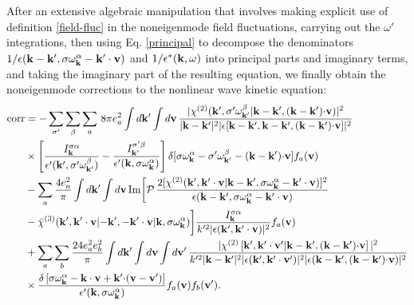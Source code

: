 \documentclass[12pt,a4paper,ruledheader]{report}
\begin{document}
After an extensive algebraic manipulation that involves making explicit
use of definition \cref{field-fluc} in the noneigenmode field fluctuations,
carrying out the $\omega '$ integrations, then using Eq. \eqref{principal}
to decompose the denominators
$1/\epsilon({\bf k-k'},\sigma \omega_{\bf k}^\alpha-{\bf k'\cdot v})$
and $1/\epsilon^*({\bf k},\omega)$ into principal parts and imaginary terms,
and taking the imaginary part of the resulting equation, we finally obtain
the noneigenmode corrections to the nonlinear wave kinetic equation:
\begin{equation}
  \label{corr}
  \begin{split}
    \mbox{corr}&=-\sum_{\sigma '}\sum_\beta\sum_a \,8\pi e_a^2
    \int d{\bf k'}\int d{\bf v}\,
    \frac{|\chi^{(2)}({\bf k'},\sigma '\omega_{\bf k'}^\beta|{\bf k-k'},
      ({\bf k-k'}){\bf \cdot v})|^2}
    {|{\bf k-k'}|^2|\epsilon[{\bf k-k'},{\bf k-k'},({\bf k-k'}){\bf \cdot v}]|^2}\\
    &\times \left[ \frac{I_{\bf k}^{\sigma \alpha}}
      {\epsilon '({\bf k'},\sigma '\omega_{\bf k'}^\beta)}
      -\frac{I_{\bf k'}^{\sigma '\beta}}
	{\epsilon '({\bf k},\sigma \omega_{\bf k}^\alpha)}\right] 
    \delta[\sigma\omega_{\bf k}^\alpha-\sigma '\omega_{\bf k'}^\beta
    -({\bf k-k'}){\bf \cdot v}]f_a({\bf v})\\
    &-\sum_a \frac{4 e_a^2}{\pi}
    \int d{\bf k '}\int d{\bf v}\,\mbox{Im}\biggl[ \mathcal{P}\,
    \frac{2[\chi^{(2)}({\bf k'},{\bf k' \cdot v}|{\bf k-k'},
      \sigma\omega_{\bf k}^\alpha-{\bf k'\cdot v})]^2}
    {\epsilon({\bf k-k'},\sigma \omega_{\bf k}^\alpha-{\bf k'\cdot v})}\\
    &-\bar \chi^{(3)}({\bf k'},{\bf k' \cdot v}|{\bf -k'},{\bf -k'\cdot v}
    |{\bf k},\sigma\omega_{\bf k}^\alpha)\biggr]
    \frac{I_{\bf k}^{\sigma \alpha}}{k'^2|\epsilon({\bf k'},{\bf k'\cdot v})|^2}
    f_a({\bf v})\\
    &+\sum_a\sum_b \frac{24 e_a^2 e_b^2}{\pi}\int d{\bf k '}
    \int d{\bf v} \int d{\bf v'}\,
    \frac{|\chi^{(2)} \left[ {\bf k'},{\bf k' \cdot v'}|
     {\bf k-k'},({\bf k-k'}){\bf \cdot v} \right]|^2}{k'^2|{\bf k-k'}|^2
   |\epsilon({\bf k'},{\bf k'\cdot v'})|^2
 |\epsilon({\bf k-k'},({\bf k-k'}){\bf \cdot v})|^2}\\
    &\times \frac{\delta \left[ \sigma\omega_{\bf k}^\alpha-{\bf k \cdot v}
	+{\bf k' \cdot}({\bf v-v'})\right]}
    {\epsilon '({\bf k},\sigma\omega_{\bf k}^\alpha)}f_a({\bf v}) f_b({\bf v'}).
  \end{split}
\end{equation}
\end{document}
